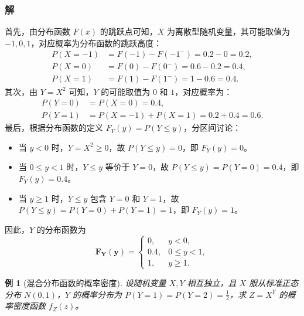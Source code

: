\documentclass{book}
\newtheorem{example}{例}[subsection]
\begin{document}
\subsubsection{解}
首先，由分布函数 $F(x)$ 的跳跃点可知，$X$ 为离散型随机变量，其可能取值为 $-1, 0, 1$，对应概率为分布函数的跳跃高度：
\[
\begin{aligned}
P(X = -1) &= F(-1) - F(-1^-) = 0.2 - 0 = 0.2, \\
P(X = 0) &= F(0) - F(0^-) = 0.6 - 0.2 = 0.4, \\
P(X = 1) &= F(1) - F(1^-) = 1 - 0.6 = 0.4.
\end{aligned}
\]
其次，由 $Y = X^2$ 可知，$Y$ 的可能取值为 $0$ 和 $1$，对应概率为：
\[
\begin{aligned}
P(Y = 0) &= P(X = 0) = 0.4, \\
P(Y = 1) &= P(X = -1) + P(X = 1) = 0.2 + 0.4 = 0.6.
\end{aligned}
\]
最后，根据分布函数的定义 $F_Y(y) = P(Y \le y)$，分区间讨论：
\begin{itemize}
  \item 当 $y < 0$ 时，$Y = X^2 \ge 0$，故 $P(Y \le y) = 0$，即 $F_Y(y) = 0$。
  \item 当 $0 \le y < 1$ 时，$Y \le y$ 等价于 $Y = 0$，故 $P(Y \le y) = P(Y = 0) = 0.4$，即 $F_Y(y) = 0.4$。
  \item 当 $y \ge 1$ 时，$Y \le y$ 包含 $Y = 0$ 和 $Y = 1$，故 $P(Y \le y) = P(Y = 0) + P(Y = 1) = 1$，即 $F_Y(y) = 1$。
\end{itemize}
因此，$Y$ 的分布函数为
\[
\boldsymbol{F_Y(y)} =
\begin{cases}
0, & y < 0, \\
0.4, & 0 \le y < 1, \\
1, & y \ge 1.
\end{cases}
\]

\begin{example}[混合分布函数的概率密度]
设随机变量 $X,Y$ 相互独立，且 $X$ 服从标准正态分布 $N(0,1)$，$Y$ 的概率分布为 $P(Y=1) = P(Y=2) = \frac{1}{2}$，求 $Z = X^Y$ 的概率密度函数 $f_Z(z)$。
\end{example}
\end{document}
